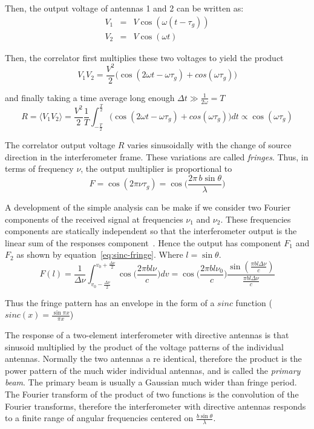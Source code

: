 Then, the output voltage of antennas 1 and 2 can be written as:
\begin{eqnarray}
V_1 &=& V\cos(\omega (t-\tau_g)) \\
V_2 &=& V\cos(\omega t)
\end{eqnarray}

Then, the correlator first multiplies these two voltages to yield the product
\begin{equation}
V_1V_2 = \frac{V^2}{2}\Bigg(\cos(2\omega t - \omega \tau_g) + cos(\omega \tau_g)\Bigg)
\end{equation}
 
and finally taking a time average long enough $\Delta t \gg \frac{1}{2\omega} = T$
\begin{equation}
R = \langle V_1V_2\rangle = \frac{V^2}{2} \frac{1}{T}\int_{-\frac{T}{2}}^{\frac{T}{2}} \big(\cos(2\omega t - \omega \tau_g) + cos(\omega \tau_g)\big) dt
\propto \cos(\omega \tau_g)
\end{equation} 
 
The correlator output voltage $R$ varies sinusoidally with the change of source direction in the interferometer frame. These variations are called \textit{fringes}. Thus, in terms of frequency $\nu$, the output multiplier is proportional to
\begin{equation}
F = \cos(2\pi \nu \tau_g) = \cos\Bigg(\frac{2\pi\, b \sin \theta}{\lambda}\Bigg)
\end{equation}

A development of the simple analysis can be make if we consider two Fourier components of the received signal at frequencies $\nu_1$ and $\nu_2$. These frequencies components are statically independent so that the interferometer output is the linear sum of the responses component~\cite{thompson01}. Hence the output has component $F_1$ and $F_2$ as shown by equation~\ref{eq:sinc-fringe}. Where $l = \sin \theta$.
\begin{equation}
\label{eq:sinc-fringe}
F(l) = \frac{1}{\Delta\nu}\int_{v_0-\frac{\Delta\nu}{2}}^{v_0+\frac{\Delta\nu}{2}}\cos\Bigg(\frac{2\pi b l \nu}{c}\Bigg)dv=
\cos\Bigg(\frac{2\pi b l \nu_0}{c}\Bigg)\frac{\sin(\frac{\pi b l \Delta \nu}{c})}{\frac{\pi b l \Delta \nu}{c}}
\end{equation}
 
Thus the fringe pattern has an envelope in the form of a $sinc$ function ($sinc(x) = \frac{\sin\pi x}{\pi x}$)

The response of a two-element interferometer with directive antennas is that sinusoid multiplied by the product of the voltage patterns of the individual antennas. Normally the two antennas a re identical, therefore the product is the power pattern of the much wider individual antennas, and is called the \textit{primary beam}. The primary beam is usually a Gaussian much wider than fringe period. The Fourier transform of the product of two functions is the convolution of the Fourier transforms, therefore the interferometer with directive antennas responds to a finite range of angular frequencies centered on $\frac{b\sin\theta}{\lambda}$.

